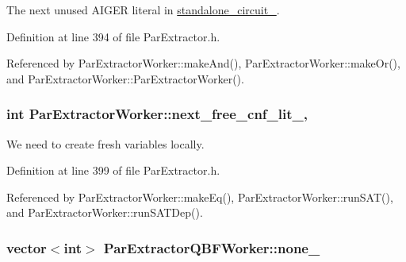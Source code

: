 The next unused A\-I\-G\-E\-R literal in \hyperlink{classParExtractorWorker_a233a7f99946695b0640e76ead6932fbb}{standalone\-\_\-circuit\-\_\-}. 



Definition at line 394 of file Par\-Extractor.\-h.



Referenced by Par\-Extractor\-Worker\-::make\-And(), Par\-Extractor\-Worker\-::make\-Or(), and Par\-Extractor\-Worker\-::\-Par\-Extractor\-Worker().

\hypertarget{classParExtractorWorker_a71f5c8e875908f12f60964ec17e2b203}{
\subsubsection[{next\-\_\-free\-\_\-cnf\-\_\-lit\-\_\-}]{\setlength{\rightskip}{0pt plus 5cm}int Par\-Extractor\-Worker\-::next\-\_\-free\-\_\-cnf\-\_\-lit\-\_\-\hspace{0.3cm}{\ttfamily [protected]}, {\ttfamily [inherited]}}}\label{classParExtractorWorker_a71f5c8e875908f12f60964ec17e2b203}


We need to create fresh variables locally. 



Definition at line 399 of file Par\-Extractor.\-h.



Referenced by Par\-Extractor\-Worker\-::make\-Eq(), Par\-Extractor\-Worker\-::run\-S\-A\-T(), and Par\-Extractor\-Worker\-::run\-S\-A\-T\-Dep().

\hypertarget{classParExtractorQBFWorker_a2c3b13b8d789c4e25aebd2a7d714cbdb}{
\subsubsection[{none\-\_\-}]{\setlength{\rightskip}{0pt plus 5cm}vector$<$int$>$ Par\-Extractor\-Q\-B\-F\-Worker\-::none\-\_\-\hspace{0.3cm}{\ttfamily [protected]}}}\label{classParExtractorQBFWorker_a2c3b13b8d789c4e25aebd2a7d714cbdb}


